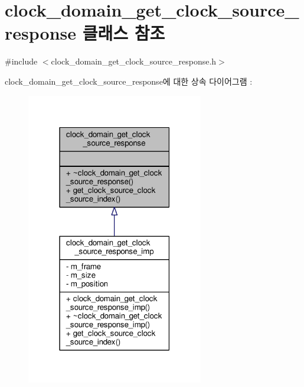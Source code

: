 \hypertarget{classavdecc__lib_1_1clock__domain__get__clock__source__response}{}\section{clock\+\_\+domain\+\_\+get\+\_\+clock\+\_\+source\+\_\+response 클래스 참조}
\label{classavdecc__lib_1_1clock__domain__get__clock__source__response}


{\ttfamily \#include $<$clock\+\_\+domain\+\_\+get\+\_\+clock\+\_\+source\+\_\+response.\+h$>$}



clock\+\_\+domain\+\_\+get\+\_\+clock\+\_\+source\+\_\+response에 대한 상속 다이어그램 \+: 
\nopagebreak
\begin{figure}[H]
\begin{center}
\leavevmode
\includegraphics[width=219pt]{classavdecc__lib_1_1clock__domain__get__clock__source__response__inherit__graph}
\end{center}
\end{figure}


